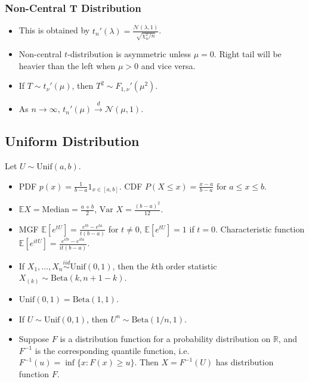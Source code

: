 \documentclass[twoside]{article}
\newcommand\bbE{\mathbb{E}}
\newcommand\bbR{\mathbb{R}}
\newcommand\calN{\mathcal{N}}
\newcommand\lmb{\lambda}
\newcommand\goesto{\rightarrow}
\newcommand\var{\text{Var }}
\begin{document}
\subsubsection{Non-Central T Distribution}
\begin{itemize}
\item This is obtained by $t_n'(\lmb) = \displaystyle\frac{\calN(\lmb, 1)}{\sqrt{\chi_n^2 / n}}$.

\item Non-central $t$-distribution is asymmetric unless $\mu = 0$. Right tail will be heavier than the left when $\mu > 0$ and vice versa.

\item If $T \sim t_\nu'(\mu)$, then $T^2 \sim F_{1, \nu}'(\mu^2)$.

\item As $n \goesto \infty$, $t_n'(\mu) \stackrel{d}{\goesto} \calN(\mu, 1)$.
\end{itemize}

\subsection{Uniform Distribution}
Let $U \sim \text{Unif}(a,b)$.
\begin{itemize}
\item PDF $p(x) = \displaystyle\frac{1}{b-a} 1_{x \in [a,b]}$. CDF $P (X \leq x) = \displaystyle\frac{x-a}{b-a}$ for $a \leq x \leq b$.

\item $\bbE X = \text{Median} = \displaystyle\frac{a+b}{2}$, $\var X = \displaystyle\frac{(b-a)^2}{12}$.

\item MGF $\bbE [e^{tU}] = \displaystyle\frac{e^{tb} - e^{ta}}{t(b-a)}$ for $t \neq 0$, $\bbE [e^{tU}] = 1$ if $t = 0$. Characteristic function $\bbE [e^{itU}] = \displaystyle\frac{e^{itb} - e^{ita}}{it(b-a)}$.

\item If $X_1, \dots, X_n \stackrel{iid}{\sim} \text{Unif}(0,1)$, then the $k$th order statistic $X_{(k)} \sim \text{Beta}(k, n + 1 - k)$.

\item $\text{Unif}(0,1) = \text{Beta}(1,1)$.

\item If $U \sim \text{Unif}(0,1)$, then $U^n \sim \text{Beta}(1/n,1)$.

\item Suppose $F$ is a distribution function for a probability distribution on $\bbR$, and $F^{-1}$ is the corresponding quantile function, i.e. $F^{-1}(u) = \inf \{ x: F(x) \geq u \}$. Then $X = F^{-1}(U)$ has distribution function $F$.

\end{itemize}
\end{document}
